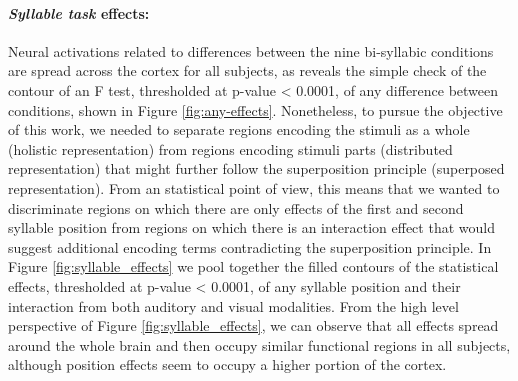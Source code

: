 \paragraph{\emph{Syllable task} effects:}
Neural activations related to differences between the nine bi-syllabic conditions are spread across the cortex for all subjects, as reveals the simple check of the contour of an F test, thresholded at p-value < 0.0001, of any difference between conditions, shown in Figure \ref{fig:any-effects}.
Nonetheless, to pursue the objective of this work, we needed to separate regions encoding the stimuli as a whole (holistic representation) from regions encoding stimuli parts (distributed representation) that might further follow the superposition principle (superposed representation).
From an statistical point of view, this means that we wanted to discriminate regions on which there are only effects of the first and second syllable position from regions on which there is an interaction effect that would suggest additional encoding terms contradicting the superposition principle.
In Figure \ref{fig:syllable_effects} we pool together the filled contours of the statistical effects, thresholded at p-value < 0.0001, of any syllable position and their interaction from both auditory and visual modalities.
From the high level perspective of Figure \ref{fig:syllable_effects}, we can observe that all effects spread around the whole brain and then occupy similar functional regions in all subjects, although position effects seem to occupy a higher portion of the cortex.

